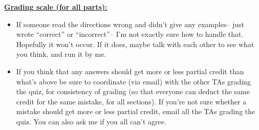 \documentclass[11pt,fleqn]{article}
\begin{document}
\begin{enumerate}
\begin{info}{\textbf{\underline{Grading scale (for all parts):}}}
\begin{itemize}
              \item If someone read the directions wrong and didn't give any
                    examples-- just wrote ``correct'' or ``incorrect''-- I'm
                    not exactly sure how to handle that.  Hopefully it won't
                    occur.  If it does, maybe talk with each other to see
                    what you think, and run it by me.

              \item If you think that any answers should get more or less
                    partial credit than what's above be sure to coordinate
                    (via email) with the other TAs grading the quiz, for
                    consistency of grading (so that everyone can deduct the
                    same credit for the same mistake, for all sections).  If
                    you're not sure whether a mistake should get more or
                    less partial credit, email all the TAs grading the quiz.
                    You can also ask me if you all can't agree.

            \end{itemize}

          \end{info}

  \end{enumerate}
\end{document}
